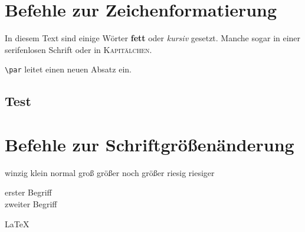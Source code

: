\documentclass{scrartcl}
\begin{document}
\tableofcontents

\section{Befehle zur Zeichenformatierung}
In diesem Text sind einige Wörter \textsf{\textbf{fett}} oder \textit{kursiv} gesetzt. Manche sogar in einer \textsf{serifenlosen Schrift} oder in \textsc{Kapitälchen}. \par \texttt{\textbackslash par} leitet einen neuen Absatz ein.

\subsection{Test}


\section{Befehle zur Schriftgrößenänderung}

\tiny winzig \small klein \normalsize normal \large groß \Large größer \LARGE noch größer \huge riesig \Huge  riesiger
\normalsize

\begin{description}
\item[erster Begriff] \blindtext
\item[zweiter Begriff] \blindtext
\end{description}

\LaTeX
\end{document}
